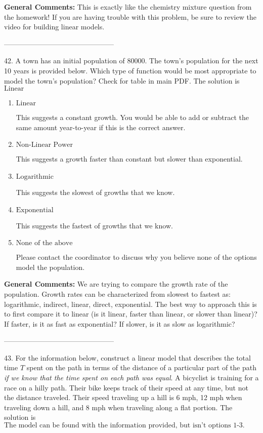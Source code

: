 \documentclass{extbook}[14pt]
\begin{document}
\textbf{General Comments:} This is exactly like the chemistry mixture question from the homework! If you are having trouble with this problem, be sure to review the video for building linear models.

-----------------------------------------------

42. A town has an initial population of 80000. The town's population for the next 10 years is provided below. Which type of function would be most appropriate to model the town's population?
Check for table in main PDF. 
The solution is $ \text{Linear} $ 

\begin{enumerate}[label=\Alph*.] 
\item $ \text{Linear} $ 

 This suggests a constant growth. You would be able to add or subtract the same amount year-to-year if this is the correct answer. 
\item $ \text{Non-Linear Power} $ 

 This suggests a growth faster than constant but slower than exponential. 
\item $ \text{Logarithmic} $ 

 This suggests the slowest of growths that we know. 
\item $ \text{Exponential} $ 

 This suggests the fastest of growths that we know. 
\item $ \text{None of the above} $ 

 Please contact the coordinator to discuss why you believe none of the options model the population. 
\end{enumerate} 
 
\textbf{General Comments:} We are trying to compare the growth rate of the population. Growth rates can be characterized from slowest to fastest as: logarithmic, indirect, linear, direct, exponential. The best way to approach this is to first compare it to linear (is it linear, faster than linear, or slower than linear)? If faster, is it as fast as exponential? If slower, is it as slow as logarithmic?

-----------------------------------------------

43. For the information below, construct a linear model that describes the total time $T$ spent on the path in terms of the distance of a particular part of the path \textit{if we know that the time spent on each path was equal}.
A bicyclist is training for a race on a hilly path. Their bike keeps track of their speed at any time, but not the distance traveled. Their speed traveling up a hill is 6 mph, 12 mph when traveling down a hill, and 8 mph when traveling along a flat portion. 
The solution is $ \text{The model can be found with the information provided, but isn't options 1-3.} $ 
\end{document}
